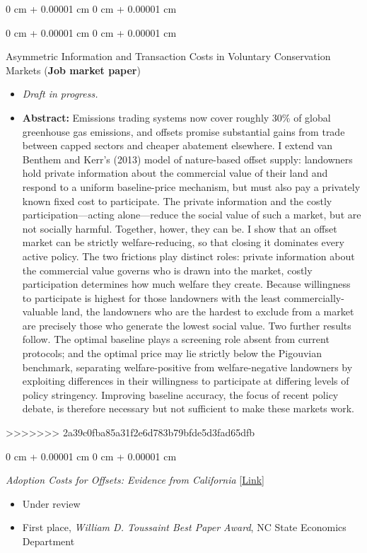\documentclass[12pt]{article}
\newenvironment{highlights}{
	\begin{itemize}[
		topsep=0.10 cm,
		parsep=0.10 cm,
		partopsep=0pt,
		itemsep=0pt,
		leftmargin=0.3 cm + 10pt,
		label={}
		]
	}{
	\end{itemize}
} %
\newenvironment{highlightsforbulletentries}{
	\begin{itemize}[
		topsep=0.10 cm,
		parsep=0.10 cm,
		partopsep=0pt,
		itemsep=-2pt,
		leftmargin=10pt,
		]
	}{
	\end{itemize}
} %
\newenvironment{onecolentry}{
	\begin{adjustwidth}{
			0 cm + 0.00001 cm
		}{
			0 cm + 0.00001 cm
		}
	}
	{
	\end{adjustwidth}
} %
\newenvironment{paper}{
	\begin{onecolentry}
	\begin{hangingpar}
}{
	\end{hangingpar}
	\end{onecolentry}
	\smallskip
} %
\begin{document}
\begin{paper}
\begin{paper}
	Asymmetric Information and Transaction Costs in Voluntary Conservation Markets (\textbf{Job market paper})
	\vspace{-0.2cm}
	\begin{highlights}
		\item[] \emph{Draft in progress.}
		\item[] \textbf{Abstract:}
		\footnotesize Emissions trading systems now cover roughly 30\% of global greenhouse gas emissions, and offsets promise substantial gains from trade between capped sectors and cheaper abatement elsewhere. I extend van Benthem and Kerr's (2013) model of nature-based offset supply: landowners hold private information about the commercial value of their land and respond to a uniform baseline-price mechanism, but must also pay a privately known fixed cost to participate. The private information and the costly participation---acting alone---reduce the social value of such a market, but are not socially harmful. Together, hower, they can be. I show that an offset market can be strictly welfare-reducing, so that closing it dominates every active policy. The two frictions play distinct roles: private information about the commercial value governs who is drawn into the market, costly participation determines how much welfare they create. Because willingness to participate is highest for those landowners with the least commercially-valuable land, the landowners who are the hardest to exclude from a market are precisely those who generate the lowest social value. Two further results follow. The optimal baseline plays a screening role absent from current protocols; and the optimal price may lie strictly below the Pigouvian benchmark, separating welfare-positive from welfare-negative landowners by exploiting differences in their willingness to participate at differing levels of policy stringency. Improving baseline accuracy, the focus of recent policy debate, is therefore necessary but not sufficient to make these markets work.
	\end{highlights}
>>>>>>> 2a39c0fba85a31f2e6d783b79bfde5d3fad65dfb
\end{paper}

\begin{paper}
	\emph{Adoption Costs for Offsets: Evidence from California} \hfill [\href{https://cenrep.ncsu.edu/publications/transaction-costs-of-emissions-offsets-evidence-from-california/}{Link}]
	\begin{highlightsforbulletentries}
		\item Under review
		\item First place, \emph{William D. Toussaint Best Paper Award}, NC State Economics Department
	\end{highlightsforbulletentries}
\end{paper}


\end{paper}
\end{document}
